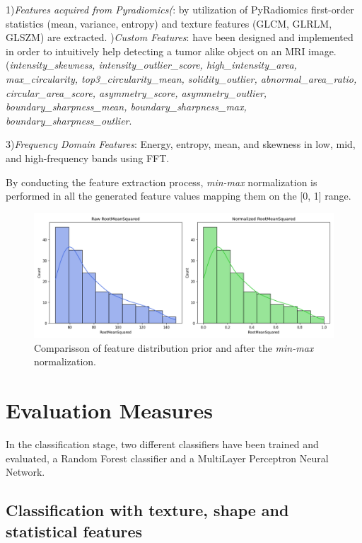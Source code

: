 \documentclass[11pt,a4paper]{report}
\begin{document}
	1)\textit{Features acquired from Pyradiomics(}: by utilization of PyRadiomics first-order statistics (mean, variance, entropy) and
	texture features (GLCM, GLRLM, GLSZM) are extracted.
	)\textit{Custom Features}: have been designed and implemented in order to intuitively help detecting a tumor alike
	object on an MRI image. (\textit{intensity\_skewness, intensity\_outlier\_score, high\_intensity\_area, max\_circularity,
	top3\_circularity\_mean, solidity\_outlier, abnormal\_area\_ratio, circular\_area\_score, asymmetry\_score, asymmetry\_outlier,
	boundary\_sharpness\_mean, boundary\_sharpness\_max, boundary\_sharpness\_outlier}.

	3)\textit{Frequency Domain Features}: Energy, entropy, mean, and skewness in low, mid, and high-frequency 
	bands using FFT.
	

	By conducting the feature extraction process, \textit{min-max} normalization is performed in all the generated feature values
	mapping them on the [0, 1] range. 
		\begin{figure}[h]
			\centering
			\includegraphics[width=1.1\textwidth]{images/RootMeanSquared.png}
			\caption{Comparisson of feature distribution prior and after the \textit{min-max} normalization.}
			\label{fig1:}
		\end{figure}		



    \section{Evaluation Measures}
		
		\par In the classification stage, two different classifiers have been trained and evaluated, a Random Forest classifier
		and a MultiLayer Perceptron Neural Network.

	\subsection{Classification with texture, shape and statistical features}
	
\end{document}
